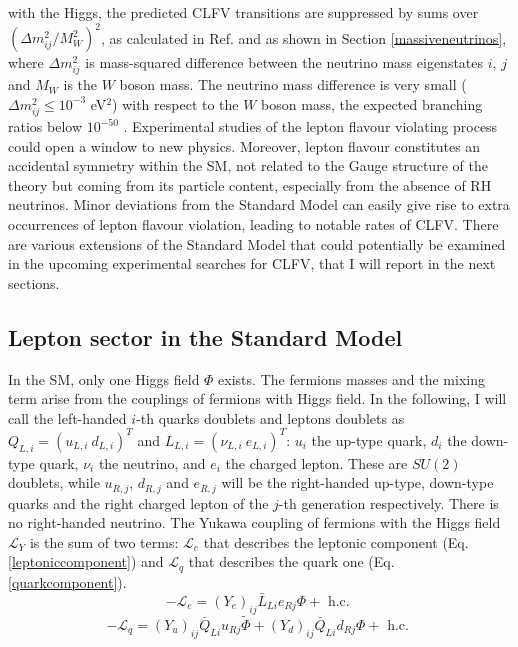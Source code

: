 with the Higgs, the predicted CLFV transitions are suppressed by sums over $(\Delta m^2_{i j}/M^2 _W)^2$, as calculated in Ref. \cite{MARCIANO1977303} and as shown in Section \ref{massiveneutrinos}, where $\Delta m^2_{ij}$ is mass-squared difference between the neutrino mass eigenstates $i$, $j$ and $M_W$ is the $W$ boson mass. The neutrino mass difference is very small ($\Delta m^2 _{i j} \leq 10^{-3}$ eV$^2$) with respect to the $W$ boson mass,
 the expected branching ratios  below $10^{-50}$ . Experimental studies of the lepton flavour violating process could open a window to new physics. Moreover, lepton flavour constitutes an accidental symmetry within the SM, not related to the Gauge structure of the theory but coming
from its particle content, especially from the absence of RH neutrinos. Minor deviations from the Standard Model can easily give rise to extra occurrences of lepton flavour violation, leading to notable rates of CLFV.
There are various extensions of the Standard Model that could potentially be examined in the upcoming experimental searches for CLFV, that I will report in the next sections.
\subsection{Lepton sector in the Standard Model}\label{leptonsector}
In the SM, only one Higgs field $\Phi$ exists. The fermions masses and the mixing term arise from the couplings of fermions with Higgs field. In the following, I will call the left-handed $i$-th quarks doublets and leptons doublets as $Q_{L,i}=(u_{L,i} \ d_{L,i})^T$ and $L_{L,i}=(\nu_{L,i} \ e_{L,i})^T$: $u_i$  the up-type quark, $d_i$ the down-type quark, $\nu_i$ the neutrino, and $e_i$ the charged lepton. These are $SU(2)$ doublets, while $u_{R,j}$, $d_{R,j}$ and $e_{R,j}$ will be the right-handed up-type, down-type quarks and the right charged lepton of the $j$-th generation respectively. There is no right-handed neutrino. The Yukawa coupling of fermions with the Higgs field $\mathscr{L}_Y$ is the sum of two terms: $\mathscr{L}_e$ that describes the leptonic component (Eq.\ref{leptoniccomponent}) and $\mathscr{L}_q$ that describes the quark one (Eq.\ref{quarkcomponent}).
\begin{equation}\label{leptoniccomponent}
    -\mathscr{L}_e=\left(Y_e\right)_{i j} \bar{L}_{L i} e_{R j} \Phi+ \text{ h.c. }
\end{equation}
\begin{equation}\label{quarkcomponent}
        -\mathscr{L}_q=\left(Y_u\right)_{i j} \bar{Q}_{L i} u_{R j} \widetilde{\Phi}+\left(Y_d\right)_{i j} \bar{Q}_{L i} d_{R j} \Phi+\text { h.c. }
\end{equation}


